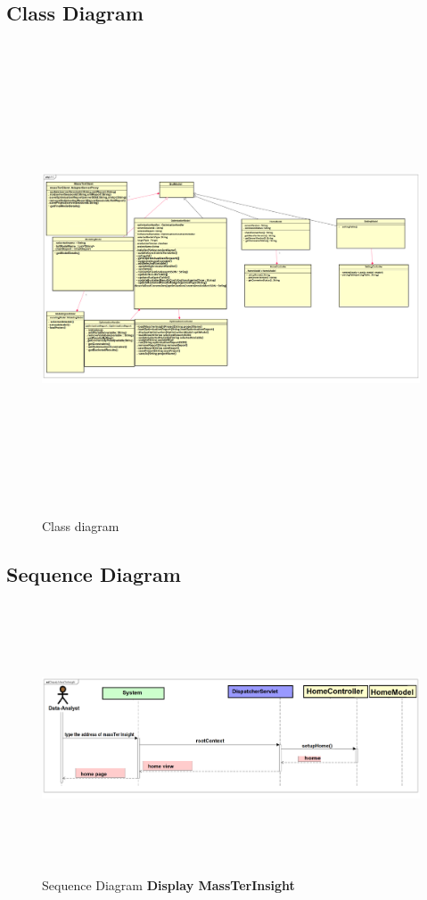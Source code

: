 	\subsection{Class Diagram}
			\begin{figure}[h]
		\centering
		\includegraphics[width=17.5cm,height=14cm]{classDiagram.png}
		\caption{Class diagram}
	\end{figure}
	\pagebreak
	\clearpage
	\newpage
	
	\subsection{Sequence Diagram}
		\begin{figure}[h]
		\centering
		\includegraphics[width=17.5cm,height=8cm]{SequenceDiagramDispalyMassTerInsight.png}
		\caption{Sequence Diagram \textbf{Display MassTerInsight}}
		\end{figure}
	
